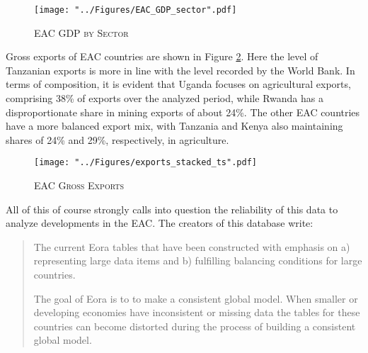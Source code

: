 \documentclass[a4paper]{article}
\begin{document}
\begin{figure}[h!]
\centering
\caption{\label{fig:EAC_GDP_sec}\textsc{EAC GDP by Sector}}
\texttt{[image: "../Figures/EAC\_GDP\_sector".pdf]} %
\end{figure}
\FloatBarrier

Gross exports of EAC countries are shown in Figure \ref{fig:exp}. Here the level of Tanzanian exports is more in line with the level recorded by the World Bank. In terms of composition, it is evident that Uganda focuses on agricultural exports, comprising 38\% of exports over the analyzed period, while Rwanda has a disproportionate share in mining exports of about 24\%. The other EAC countries have a more balanced export mix, with Tanzania and Kenya also maintaining shares of 24\% and 29\%, respectively, in agriculture. 


\begin{figure}[h!]
\centering
\caption{\label{fig:exp}\textsc{EAC Gross Exports}}
\texttt{[image: "../Figures/exports\_stacked\_ts".pdf]} %
\end{figure}
\FloatBarrier

All of this of course strongly calls into question the reliability of this data to analyze developments in the EAC. The creators of this database write:

\begin{quote}
The current Eora tables that have been constructed with emphasis on a) representing large data items and b) fulfilling balancing conditions for large countries.

The goal of Eora is to to make a consistent global model. When smaller or developing economies have inconsistent or missing data the tables for these countries can become distorted during the process of building a consistent global model. %
\end{quote}
\end{document}
